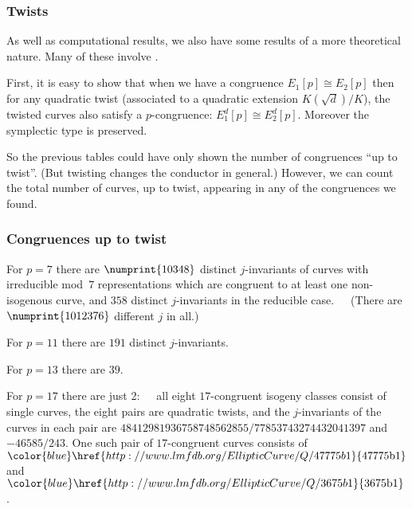 \documentclass[compress]{beamer}
\newcommand{\lmfdbec}[3]{\color{blue}\href{http://www.lmfdb.org/EllipticCurve/Q/#1#2#3}{{\text{\rm#1#2#3}}}}
\newcommand{\high}[1]{\emph{\color{blue}{#1}}}
\begin{document}
\begin{frame}\frametitle{Twists}
As well as computational results, we also have some results of a
more theoretical nature.  Many of these involve \high{twists}.

\pause\medskip
First, it is easy to show that when we have a congruence $E_1[p]\cong
E_2[p]$ then for any quadratic twist (associated to a quadratic
extension $K(\sqrt{d})/K$), the twisted curves also satisfy a
$p$-congruence: $E_1^d[p]\cong E_2^d[p]$.  Moreover the symplectic
type is preserved.

\pause\medskip
So the previous tables could have only shown the number of congruences
``up to twist''.  (But twisting changes the conductor in general.)
However, we can count the total number of curves, up to twist,
appearing in any of the congruences we found.

\end{frame}

\begin{frame}\frametitle{Congruences up to twist}
For $p=7$ there are $\numprint{10348}$ distinct $j$-invariants of
curves with irreducible mod~$7$ representations which are congruent to
at least one non-isogenous curve, and $358$ distinct $j$-invariants in
the reducible case.\pause\ \ \   (There are $\numprint{1012376}$ different $j$ in
all.)

\pause\medskip
For $p=11$ there are $191$ distinct $j$-invariants.

For $p=13$ there are $39$.

For $p=17$ there are just 2:\ \ \ \pause all eight $17$-congruent isogeny
classes consist of single curves, the eight pairs are quadratic
twists, and the $j$-invariants of the curves in each pair are
$48412981936758748562855/77853743274432041397$ and $-46585/243$.  One
such pair of $17$-congruent curves consists of $\lmfdbec{47775}{b}{1}$
and~$\lmfdbec{3675}{b}{1}$.

\end{frame}
\end{document}
